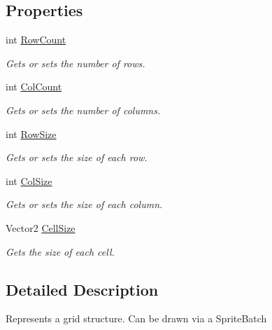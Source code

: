 \subsection*{Properties}
\begin{DoxyCompactItemize}
\item 
int \hyperlink{class_m_b2_d_1_1_geometry_1_1_grid_ad2599c5d630bb783ff2ba062c276be9a}{Row\+Count}
\begin{DoxyCompactList}\small\item\em Gets or sets the number of rows. \end{DoxyCompactList}\item 
int \hyperlink{class_m_b2_d_1_1_geometry_1_1_grid_a515c09f56ad55f3742b6a0eccdb15856}{Col\+Count}
\begin{DoxyCompactList}\small\item\em Gets or sets the number of columns. \end{DoxyCompactList}\item 
int \hyperlink{class_m_b2_d_1_1_geometry_1_1_grid_a38536c42bc3d3d5e58d648fd7b7f8e17}{Row\+Size}
\begin{DoxyCompactList}\small\item\em Gets or sets the size of each row. \end{DoxyCompactList}\item 
int \hyperlink{class_m_b2_d_1_1_geometry_1_1_grid_aef6e8277c73fcb160fa551836f3685da}{Col\+Size}
\begin{DoxyCompactList}\small\item\em Gets or sets the size of each column. \end{DoxyCompactList}\item 
Vector2 \hyperlink{class_m_b2_d_1_1_geometry_1_1_grid_afdee3fa9df7802b3b15aa8785621a110}{Cell\+Size}
\begin{DoxyCompactList}\small\item\em Gets the size of each cell. \end{DoxyCompactList}\end{DoxyCompactItemize}


\subsection{Detailed Description}
Represents a grid structure. Can be drawn via a Sprite\+Batch 



